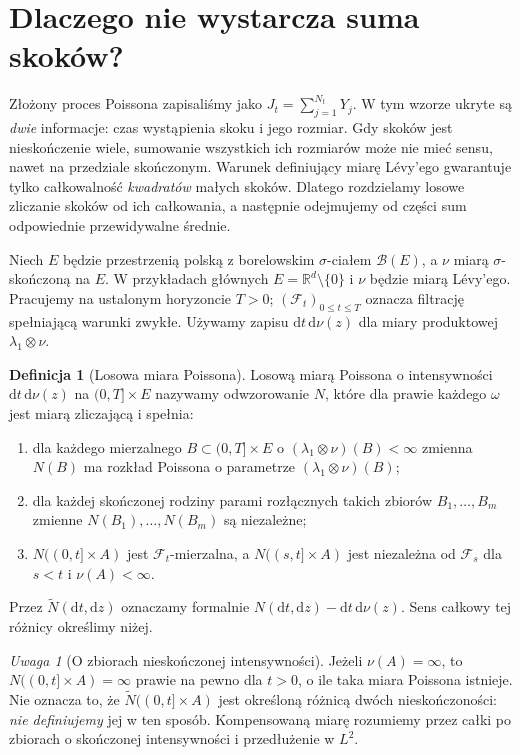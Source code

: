\documentclass[11pt,a4paper,oneside]{report}
\numberwithin{equation}{chapter}
\theoremstyle{plain}
\theoremstyle{definition}
\newtheorem{definicja}{Definicja}[chapter]
\theoremstyle{remark}
\newtheorem{uwaga}{Uwaga}[chapter]
\newcommand{\R}{\mathbb{R}}
\newcommand{\calF}{\mathcal{F}}
\newcommand{\calB}{\mathcal{B}}
\newcommand{\dd}{\mathrm{d}}
\begin{document}
\label{ch:poisson-random-measure}

\section{Dlaczego nie wystarcza suma skoków?}\label{sec:volIII:11:01}

Złożony proces Poissona zapisaliśmy jako $J_t=\sum_{j=1}^{N_t}Y_j$.
W tym wzorze ukryte są \emph{dwie} informacje: czas wystąpienia
skoku i jego rozmiar. Gdy skoków jest nieskończenie wiele, sumowanie
wszystkich ich rozmiarów może nie mieć sensu, nawet na przedziale
skończonym. Warunek definiujący miarę Lévy'ego gwarantuje tylko
całkowalność \emph{kwadratów} małych skoków. Dlatego rozdzielamy
losowe zliczanie skoków od ich całkowania, a następnie odejmujemy
od części sum odpowiednie przewidywalne średnie.

Niech $E$ będzie przestrzenią polską z borelowskim $\sigma$-ciałem
$\calB(E)$, a $\nu$ miarą $\sigma$-skończoną na $E$.
W przykładach głównych $E=\R^d\setminus\{0\}$ i $\nu$ będzie
miarą Lévy'ego. Pracujemy na ustalonym horyzoncie $T>0$;
$(\calF_t)_{0\le t\le T}$ oznacza filtrację spełniającą warunki
zwykłe. Używamy zapisu $\dd t\,\dd\nu(z)$ dla miary
produktowej $\lambda_1\otimes\nu$.

\begin{definicja}[Losowa miara Poissona]\label{def:volIII:11:01}
\label{def:PRM}
Losową miarą Poissona o intensywności $\dd t\,\dd\nu(z)$ na
$(0,T]\times E$ nazywamy odwzorowanie $N$, które dla prawie każdego
$\omega$ jest miarą zliczającą i spełnia:
\begin{enumerate}
\item dla każdego mierzalnego $B\subset(0,T]\times E$ o
$(\lambda_1\otimes\nu)(B)<\infty$ zmienna $N(B)$ ma rozkład
Poissona o parametrze $(\lambda_1\otimes\nu)(B)$;
\item dla każdej skończonej rodziny parami rozłącznych takich
zbiorów $B_1,\ldots,B_m$ zmienne $N(B_1),\ldots,N(B_m)$ są niezależne;
\item $N((0,t]\times A)$ jest $\calF_t$-mierzalna, a
$N((s,t]\times A)$ jest niezależna od $\calF_s$ dla $s<t$
i $\nu(A)<\infty$.
\end{enumerate}
Przez $\widetilde N(\dd t,\dd z)$ oznaczamy formalnie
$N(\dd t,\dd z)-\dd t\,\dd\nu(z)$. Sens całkowy tej różnicy
określimy niżej.
\end{definicja}

\begin{uwaga}[O zbiorach nieskończonej intensywności]
Jeżeli $\nu(A)=\infty$, to $N((0,t]\times A)=\infty$
prawie na pewno dla $t>0$, o ile taka miara Poissona istnieje.
Nie oznacza to, że $\widetilde N((0,t]\times A)$ jest określoną
różnicą dwóch nieskończoności: \emph{nie definiujemy} jej w ten
sposób. Kompensowaną miarę rozumiemy przez całki po zbiorach o
skończonej intensywności i przedłużenie w $L^2$.
\end{uwaga}
\end{document}
